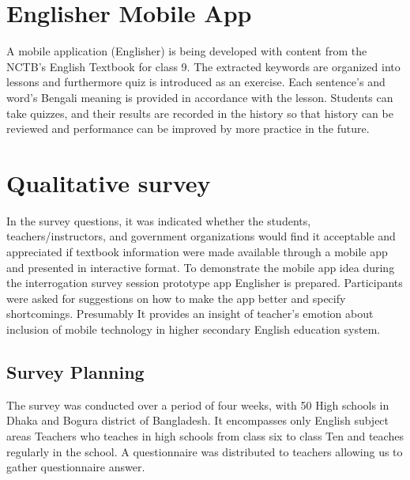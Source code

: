\documentclass[sn-mathphys,Numbered]{sn-jnl}%
\theoremstyle{thmstyleone}%
\theoremstyle{thmstyletwo}%
\theoremstyle{thmstylethree}%
\begin{document}
\section{Englisher Mobile App}
A mobile application (Englisher) is being developed with content from the NCTB’s English Textbook for class 9. The extracted keywords are organized into lessons and furthermore quiz is introduced as an exercise. Each sentence's and word's Bengali meaning is provided in accordance with the lesson. Students can take quizzes, and their results are recorded in the history so that history can be reviewed and performance can be improved by more practice in the future. 

%        

\section{Qualitative survey}
In the survey questions, it was indicated whether the students, teachers/instructors, and government organizations would find it acceptable and appreciated if textbook information were made available through a mobile app and presented in interactive format. To demonstrate the mobile app idea during the interrogation survey session prototype app Englisher is prepared. Participants were asked for suggestions on how to make the app better and specify shortcomings. Presumably It provides an insight of teacher’s emotion about inclusion of mobile technology in higher secondary English education system. 

\subsection{Survey Planning}
The survey was conducted over a period of four weeks, with 50 High schools in Dhaka and Bogura district of Bangladesh. It encompasses only English subject areas Teachers who teaches in high schools from class six to class Ten and teaches regularly in the school. A questionnaire was distributed to teachers allowing us to gather questionnaire answer. 
\end{document}
